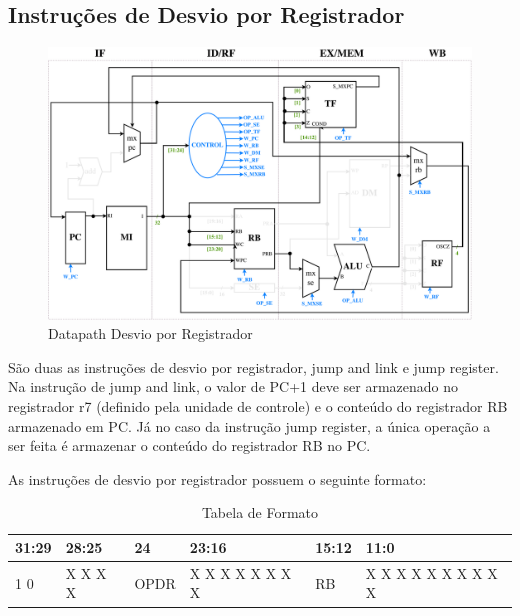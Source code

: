 \documentclass{report}
\begin{document}
\newpage
\subsection{Instruções de Desvio por Registrador}
\begin{figure}[H]
\centering
\includegraphics[width=\textwidth]{./pictures/DatapathDER.pdf}
\caption{Datapath Desvio por Registrador}
\end{figure}
São duas as instruções de desvio por registrador, jump and link e jump register. Na instrução de jump and link, o valor de PC+1 deve ser armazenado no registrador r7 (definido pela unidade de controle) e o conteúdo do registrador RB armazenado em PC. Já no caso da instrução jump register, a única operação a ser feita é armazenar o conteúdo do registrador RB no PC.\newline

As instruções de desvio por registrador possuem o seguinte formato:

\FloatBarrier
\begin{table}[H]
  \begin{center}
  \renewcommand{\arraystretch}{1.46}
    \begin{tabular}[pos]{|>{\centering\arraybackslash}m{33pt}|>{\centering\arraybackslash}m{44pt}|>{\centering\arraybackslash}m{29pt}|>{\centering\arraybackslash}m{90pt}|>{\centering\arraybackslash}m{44pt}|>{\centering\arraybackslash}m{112pt}|} \hline
      \cellcolor[gray]{0.9}\textbf{31:29} & \cellcolor[gray]{0.9}\textbf{28:25} & \cellcolor[gray]{0.9}\textbf{24} & \cellcolor[gray]{0.9}\textbf{23:16} & \cellcolor[gray]{0.9}\textbf{15:12} & \cellcolor[gray]{0.9}\textbf{11:0} \\ \hline
        1 1 0       & X X X X       & OPDR       & X X X X X X X X       & RB        & X X X X X X X X X X \\ \hline
    \end{tabular}
    \caption{Tabela de Formato}
  \end{center}
\end{table}  
\end{document}
